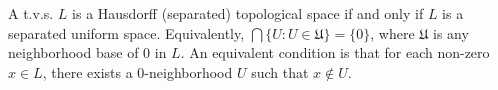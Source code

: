 A t.v.s. $L$ is a Hausdorff (separated) topological space if and only if $L$ is a separated uniform space. Equivalently, $\bigcap \{U : U \in \mathfrak{U}\} = \{0\}$, where $\mathfrak{U}$ is any neighborhood base of 0 in $L$. An equivalent condition is that for each non-zero $x \in L$, there exists a 0-neighborhood $U$ such that $x \notin U$.
